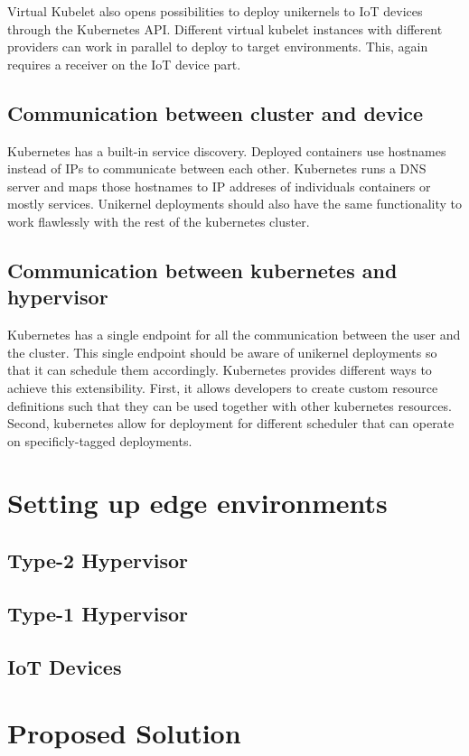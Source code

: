 Virtual Kubelet also opens possibilities to deploy unikernels to IoT devices through the Kubernetes API. Different virtual kubelet instances with different providers can work in parallel to deploy to target environments. This, again requires a receiver on the IoT device part. 
\subsection{Communication between cluster and device}
Kubernetes has a built-in service discovery. Deployed containers use hostnames instead of IPs to communicate between each other. Kubernetes runs a DNS server and maps those hostnames to IP addreses of individuals containers or mostly services. Unikernel deployments should also have the same functionality to work flawlessly with the rest of the kubernetes cluster. 

\subsection{Communication between kubernetes and hypervisor}
Kubernetes has a single endpoint for all the communication between the user and the cluster. This single endpoint should be aware of unikernel deployments so that it can schedule them accordingly. Kubernetes provides different ways to achieve this extensibility. First, it allows developers to create custom resource definitions such that they can be used together with other kubernetes resources. Second, kubernetes allow for deployment for different scheduler that can operate on specificly-tagged deployments. 


\section{Setting up edge environments}
\subsection{Type-2 Hypervisor}
\subsection{Type-1 Hypervisor}
\subsection{IoT Devices}

\iffalse
\section{Proposed Solution}

